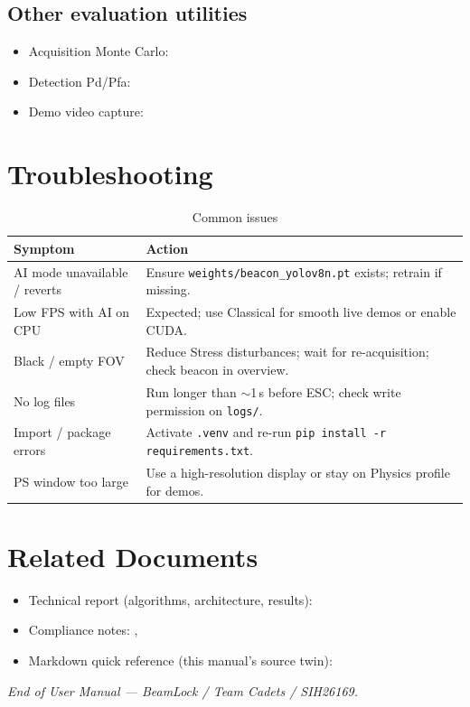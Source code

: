 \documentclass[11pt,a4paper]{article}
\begin{document}
\subsection{Other evaluation utilities}
\begin{itemize}
  \item Acquisition Monte Carlo: 
  \item Detection Pd/Pfa: 
  \item Demo video capture: 
\end{itemize}

\section{Troubleshooting}

\begin{table}[H]
\centering
\caption{Common issues}
\label{tab:trouble}
\small
\begin{tabular}{@{}p{4.8cm}p{8.8cm}@{}}
\toprule
\textbf{Symptom} & \textbf{Action} \\
\midrule
AI mode unavailable / reverts & Ensure \texttt{weights/beacon\_yolov8n.pt} exists; retrain if missing. \\
Low FPS with AI on CPU & Expected; use Classical for smooth live demos or enable CUDA. \\
Black / empty FOV & Reduce Stress disturbances; wait for re-acquisition; check beacon in overview. \\
No log files & Run longer than $\sim$1\,s before ESC; check write permission on \texttt{logs/}. \\
Import / package errors & Activate \texttt{.venv} and re-run \texttt{pip install -r requirements.txt}. \\
PS window too large & Use a high-resolution display or stay on Physics profile for demos. \\
\bottomrule
\end{tabular}
\end{table}

\section{Related Documents}

\begin{itemize}
  \item Technical report (algorithms, architecture, results): 
  \item Compliance notes: , 
  \item Markdown quick reference (this manual's source twin): 
\end{itemize}

\vspace{1.2em}
\noindent\textit{End of User Manual --- BeamLock / Team Cadets / SIH26169.}
\end{document}
